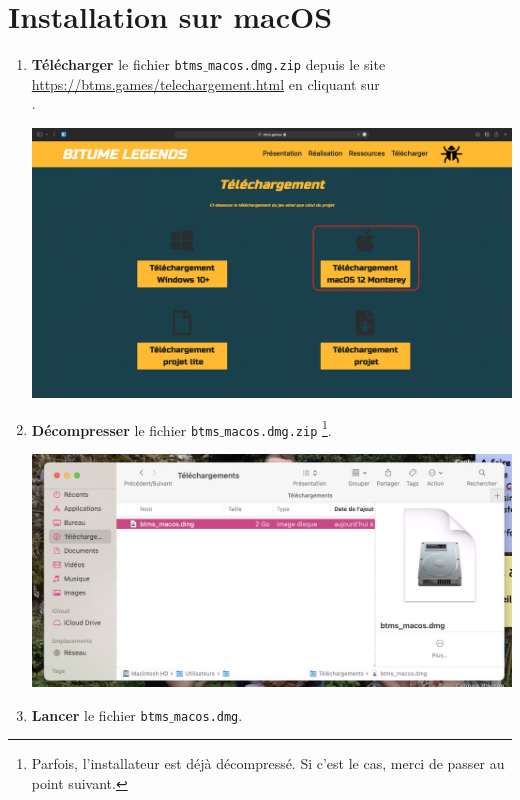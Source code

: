 \documentclass[a4paper,12pt]{article}
\begin{document}
        \clearpage

    \section{Installation sur macOS}
        \begin{enumerate}
            \item
                \textbf{Télécharger} le fichier \texttt{btms$\_$macos.dmg.zip}
                depuis le site \\\url{https://btms.games/telechargement.html} en
                cliquant sur \\.\\
                \begin{center}
                    \includegraphics[scale=0.2]{dl_page_mac.png}
                \end{center}
            \item
                \textbf{Décompresser} le fichier \texttt{btms$\_$macos.dmg.zip}
                \footnote{Parfois, l'installateur est déjà décompressé. Si c'est
                le cas, merci de passer au point suivant.}.\\
                \begin{center}
                    \includegraphics[scale=0.4]{dmg_in_dl.png}
                \end{center}
            \item
                \textbf{Lancer} le fichier \texttt{btms$\_$macos.dmg}.
            

\end{enumerate}
\end{document}
